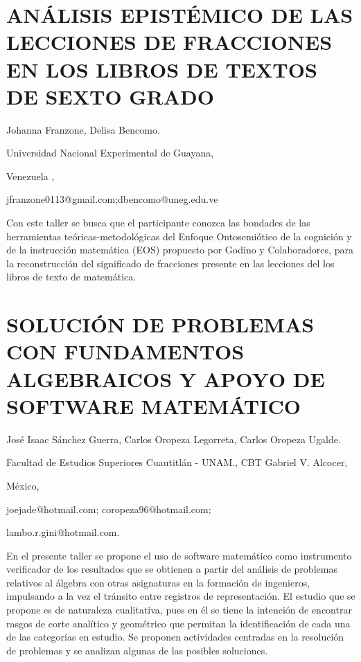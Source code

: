 \section{ANÁLISIS EPISTÉMICO DE LAS LECCIONES DE FRACCIONES EN LOS LIBROS
DE TEXTOS DE SEXTO GRADO}

\begin{datos}

Johanna Franzone, Delisa Bencomo.

Universidad Nacional Experimental de Guayana,

Venezuela ,

jfranzone0113@gmail.com;dbencomo@uneg.edu.ve

\end{datos}

Con este taller se busca que el participante conozca las bondades
de las herramientas teóricas-metodológicas del Enfoque Ontosemiótico
de la cognición y de la instrucción matemática (EOS) propuesto por
Godino y Colaboradores, para la reconstrucción del significado de
fracciones presente en las lecciones del los libros de texto de matemática. 


\section{\uppercase{ Solución de problemas con fundamentos algebraicos y
apoyo de software matemático }}

\begin{datos}

José Isaac Sánchez Guerra, Carlos Oropeza Legorreta, Carlos Oropeza
Ugalde.

Facultad de Estudios Superiores Cuautitlán - UNAM., CBT Gabriel V.
Alcocer,

México,

joejade@hotmail.com; coropeza96@hotmail.com;

lambo.r.gini@hotmail.com. 

\end{datos}

En el presente taller se propone el uso de software matemático como
instrumento verificador de los resultados que se obtienen a partir
del análisis de problemas relativos al álgebra con otras asignaturas
en la formación de ingenieros, impulsando a la vez el tránsito entre
registros de representación. El estudio que se propone es de naturaleza
cualitativa, pues en él se tiene la intención de encontrar rasgos
de corte analítico y geométrico que permitan la identificación de
cada una de las categorías en estudio. Se proponen actividades centradas
en la resolución de problemas y se analizan algunas de las posibles
soluciones.


